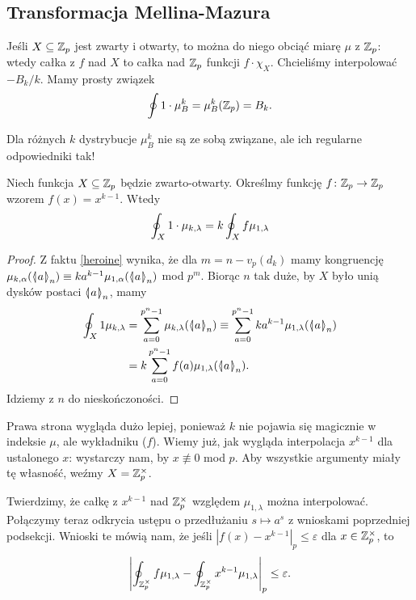 \subsection{Transformacja Mellina-Mazura}
Jeśli $X \subseteq \mathbb Z_p$ jest zwarty i otwarty, to można do niego obciąć miarę $\mu$ z $\mathbb Z_p$: wtedy całka z $f$ nad $X$ to całka nad $\mathbb Z_p$ funkcji $f \cdot \chi_X$.
Chcieliśmy interpolować $-B_k / k$.
Mamy prosty związek
\[
	\oint 1 \cdot \mu_B^k = \mu_B^k (\mathbb Z_p) = B_k.
\]

Dla różnych $k$ dystrybucje $\mu_B^k$ nie są ze sobą związane, ale ich regularne odpowiedniki tak!

\begin{wniosek}
	Niech funkcja $X \subseteq \mathbb Z_p$ będzie zwarto-otwarty.
	Określmy funkcję $f \colon \mathbb Z_p \to \mathbb Z_p$ wzorem $f(x) = x^{k-1}$.
	Wtedy
\[
	\oint_X 1 \cdot \mu_{k, \lambda} = k \oint_X f \mu_{1, \lambda}
\]
\end{wniosek}

\begin{proof}
	Z faktu \ref{heroine} wynika, że dla $m = n - v_p (d_k)$ mamy kongruencję $\mu_{k, \alpha}(\mathrel{\langle\mkern-3.85mu\mid\mkern-4mu} {a}\mathrel{\mkern-4mu\mid\mkern-3.85mu\rangle}_{n}) \equiv ka^{k-1} \mu_{1, \alpha} (\mathrel{\langle\mkern-3.85mu\mid\mkern-4mu} {a}\mathrel{\mkern-4mu\mid\mkern-3.85mu\rangle}_{n})$ mod $p^m$.
	Biorąc $n$ tak duże, by $X$ było unią dysków postaci $\mathrel{\langle\mkern-3.85mu\mid\mkern-4mu} {a}\mathrel{\mkern-4mu\mid\mkern-3.85mu\rangle}_{n}$, mamy
	\begin{align*}
		\kobint_X 1 \mu_{k, \lambda} & = 
		\sum_{a=0}^{p^n-1} \mu_{k, \lambda} (\dysk{a}{n}) \equiv 
		\sum_{a=0}^{p^n-1} ka^{k-1} \mu_{1, \lambda} (\dysk{a}{n}) \\ & = 
		k \sum_{a=0}^{p^n-1} f(a) \mu_{1, \lambda} (\dysk{a}{n}).
	\end{align*}
	Idziemy z $n$ do nieskończoności.
\end{proof}

Prawa strona wygląda dużo lepiej, ponieważ $k$ nie pojawia się magicznie w indeksie $\mu$, ale wykładniku ($f$).
Wiemy już, jak wygląda interpolacja $x^{k-1}$ dla ustalonego $x$: wystarczy nam, by $x \not\equiv 0$ mod $p$.
Aby wszystkie argumenty miały tę własność, weźmy $X = \mathbb Z_p^\times$.

Twierdzimy, że całkę z $x^{k-1}$ nad $\mathbb Z_p^\times$ względem $\mu_{1, \lambda}$ można interpolować.
Połączymy teraz odkrycia ustępu o przedłużaniu $s \mapsto a^s$ z wnioskami poprzedniej podsekcji.
Wnioski te mówią nam, że jeśli $|f(x) - x^{k-1}|_p \le \varepsilon$ dla $x \in \mathbb Z_p^\times$, to
\[
	\left|\oint_{\mathbb Z_p^\times} f \mu_{1, \lambda} - \oint_{\mathbb Z_p^\times} x^{k-1} \mu_{1, \lambda}\right|_p \le \varepsilon.
\]


